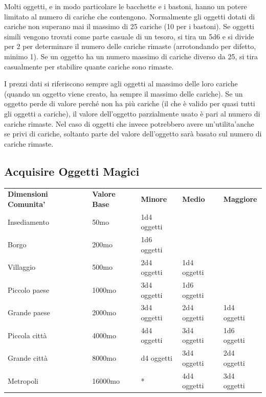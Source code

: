 \documentclass[a4paper,11pt,twoside,openany]{book}
\begin{document}
\label{cariche-dosi-e-usi-multipli}

Molti oggetti, e in modo particolare le bacchette e i bastoni, hanno un potere limitato al numero di cariche che contengono. Normalmente gli oggetti dotati di cariche non superano mai il massimo di 25 cariche (10 per i bastoni). Se oggetti simili vengono trovati come parte casuale di un tesoro, si tira un 5d6 e si divide per 2 per determinare il numero delle cariche rimaste (arrotondando per difetto, minimo 1). Se un oggetto ha un numero massimo di cariche diverso da 25, si tira casualmente per stabilire quante cariche sono rimaste.

I prezzi dati si riferiscono sempre agli oggetti al massimo delle loro cariche (quando un oggetto viene creato, ha sempre il massimo delle cariche). Se un oggetto perde di valore perché non ha più cariche (il che è valido per quasi tutti gli oggetti a cariche), il valore dell'oggetto parzialmente usato è pari al numero di cariche rimaste. Nel caso di oggetti che invece potrebbero avere un'utilita'anche se privi di cariche, soltanto parte del valore dell'oggetto sarà basato sul numero di cariche rimaste.


\subsection{Acquisire Oggetti Magici}

\label{acquisire-oggetti-magici}

\bigskip

\begin{tabular}{lllll}
	\toprule
	\textbf{Dimensioni Comunita'} & \textbf{Valore Base} & \textbf{Minore} & \textbf{Medio} & \textbf{Maggiore}\\
	Insediamento  & 50mo & 1d4 oggetti     && \\
	Borgo         & 200mo& 1d6 oggetti     && \\
	Villaggio     & 500mo& 2d4 oggetti     & 1d4 oggetti    & \\
	Piccolo paese & 1000mo               & 3d4 oggetti     & 1d6 oggetti    & \\
	Grande paese  & 2000mo               & 3d4 oggetti     & 2d4 oggetti    & 1d4 oggetti\\
	Piccola città & 4000mo               & 4d4 oggetti     & 3d4 oggetti    & 1d6 oggetti\\
	Grande città  & 8000mo               & d4 oggetti      & 3d4 oggetti    & 2d4 oggetti\\
	Metropoli     & 16000mo              & {*}             & 4d4 oggetti    & 3d4 oggetti\\
\end{tabular}
\end{document}
